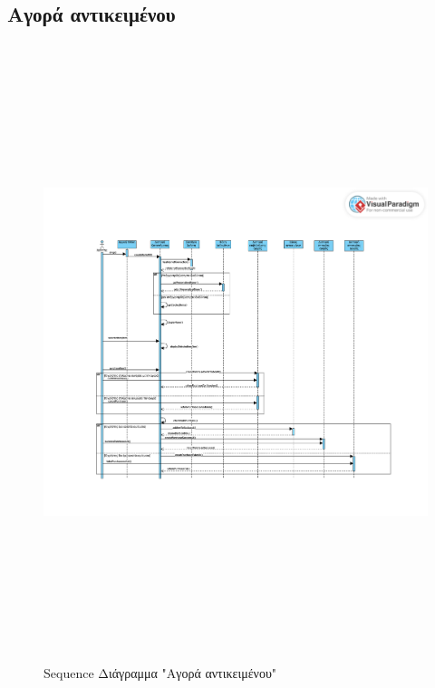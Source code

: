 \subsection{Αγορά αντικειμένου}
\begin{figure}[!htb]
\begin{center}
    \includegraphics[width=20cm,height=18cm]{sequence_shop.png}
    \caption{Sequence Διάγραμμα "Αγορά αντικειμένου"}
    \label{}
    \end{center}
\end{figure}
\newpage


